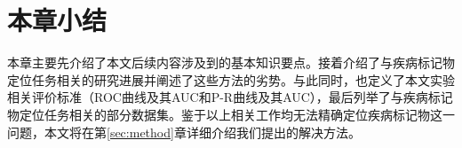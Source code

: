 
\section{本章小结}
本章主要先介绍了本文后续内容涉及到的基本知识要点。接着介绍了与疾病标记物定位任务相关的研究进展并阐述了这些方法的劣势。与此同时，也定义了本文实验相关评价标准（ROC曲线及其AUC和P-R曲线及其AUC），最后列举了与疾病标记物定位任务相关的部分数据集。鉴于以上相关工作均无法精确定位疾病标记物这一问题，本文将在第\ref{sec:method}章详细介绍我们提出的解决方法。


